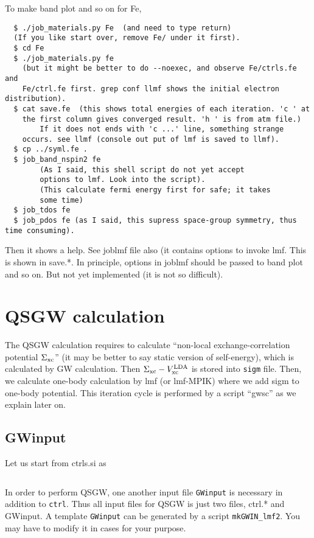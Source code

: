 \documentclass[a4paper,10pt,epsf,fleqn]{article}
\begin{document}
To make band plot and so on for Fe,
\begin{verbatim}
  $ ./job_materials.py Fe  (and need to type return)
  (If you like start over, remove Fe/ under it first).
  $ cd Fe
  $ ./job_materials.py fe
    (but it might be better to do --noexec, and observe Fe/ctrls.fe and
	Fe/ctrl.fe first. grep conf llmf shows the initial electron distribution).
  $ cat save.fe  (this shows total energies of each iteration. 'c ' at
	the first column gives converged result. 'h ' is from atm file.)
        If it does not ends with 'c ...' line, something strange
	occurs. see llmf (console out put of lmf is saved to llmf).
  $ cp ../syml.fe .
  $ job_band_nspin2 fe 
        (As I said, this shell script do not yet accept
	    options to lmf. Look into the script).
        (This calculate fermi energy first for safe; it takes
	    some time)       
  $ job_tdos fe
  $ job_pdos fe (as I said, this supress space-group symmetry, thus time consuming).
\end{verbatim}
Then it shows a help. 
See joblmf file also (it contains options to invoke lmf. This is shown
in save.*. In principle, options in joblmf should be passed to band plot
and so on. But not yet implemented (it is not so difficult).



\newpage
\section{QSGW calculation}
The QSGW calculation requires to calculate ``non-local exchange-correlation
potential $\Sigma_{\rm xc}$'' (it may be better to say static version of self-energy), which is
calculated by GW calculation. Then $\Sigma_{\rm xc}-V_{\rm xc}^{\rm
LDA}$ is stored into \verb+sigm+ file. Then, we calculate one-body
calculation by lmf (or lmf-MPIK) where we add sigm to one-body
potential. This iteration cycle is performed by a script ``gwsc'' as we
explain later on.

\subsection{GWinput}
Let us start from ctrls.si as
\begin{verbatim}

\end{verbatim}

\label{GWinput}
In order to perform QSGW, one another input file 
\verb+GWinput+ is necessary in addition to \verb+ctrl+.
Thus all input files for QSGW is just two files, ctrl.* and GWinput.
A template \verb+GWinput+ can be generated by a script \verb+mkGWIN_lmf2+. 
You may have to modify it in cases for your purpose.
\end{document}
